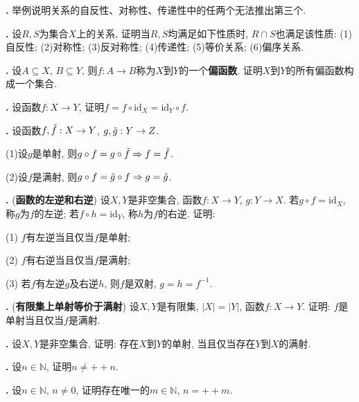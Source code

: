 \par \textbf{\theprobset .} 举例说明关系的自反性、对称性、传递性中的任两个无法推出第三个.

\par \textbf{\theprobset .} 设$R, S$为集合$X$上的关系, 证明当$R,S$均满足如下性质时, $R\cap S$也满足该性质: (1)自反性; (2)对称性; (3)反对称性; (4)传递性; (5)等价关系; (6)偏序关系. 

\par \textbf{\theprobset .} 设$A\subseteq X$, $B\subseteq Y$, 则$f:A\to B$称为$X$到$Y$的一个\textbf{偏函数}. 证明$X$到$Y$的所有偏函数构成一个集合. 

\par \textbf{\theprobset .} \cite{AnT1} 设函数$f:X\to Y$, 证明$f=f\circ \mathrm{id}_X=\mathrm{id}_Y\circ f$.

\par \textbf{\theprobset .} \cite{AnT1} 设函数$f, \Tilde{f}:X\to Y$, $g, \Tilde{g}: Y\to Z$. 
\par (1)设$g$是单射, 则$g\circ f=g\circ \Tilde{f}\Rightarrow f=\Tilde{f}$.
\par (2)设$f$是满射, 则$g\circ f=\Tilde{g}\circ f\Rightarrow g=\Tilde{g}$.

\par \textbf{\theprobset .} (\textbf{函数的左逆和右逆}) 设$X, Y$是非空集合, 函数$f:X \to Y$, $g:Y \to X$. 若$g \circ f=\mathrm{id}_X$, 称$g$为$f$的左逆; 若$f \circ h=\mathrm{id}_Y$, 称$h$为$f$的右逆. 证明:
\par (1) $f$有左逆当且仅当$f$是单射;
\par (2) $f$有右逆当且仅当$f$是满射;
\par (3) 若$f$有左逆$g$及右逆$h$, 则$f$是双射, $g=h=f^{-1}$.

\par \textbf{\theprobset .} (\textbf{有限集上单射等价于满射}) 设$X, Y$是有限集, $|X|=|Y|$, 函数$f: X\to Y$. 证明: $f$是单射当且仅当$f$是满射.

\par \textbf{\theprobset .} 设$X,Y$是非空集合, 证明: 存在$X$到$Y$的单射, 当且仅当存在$Y$到$X$的满射. 

\par \textbf{\theprobset .} 设$n\in \mathbb{N}$, 证明$n\neq ++n$. 

\par \textbf{\theprobset .} 设$n\in \mathbb{N}$, $n\neq 0$, 证明存在唯一的$m\in \mathbb{N}$, $n=++m$.

